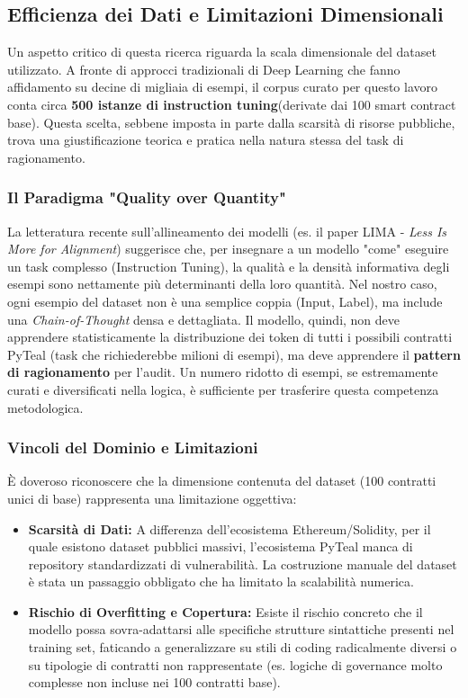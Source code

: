 \subsection{Efficienza dei Dati e Limitazioni Dimensionali}
\label{sec:dataset_limitations}

Un aspetto critico di questa ricerca riguarda la scala dimensionale del dataset utilizzato. A fronte di approcci tradizionali di Deep Learning che fanno affidamento su decine di migliaia di esempi, il corpus curato per questo lavoro conta circa\textbf{ 500 istanze di instruction tuning}(derivate dai 100 smart contract base).
Questa scelta, sebbene imposta in parte dalla scarsità di risorse pubbliche, trova una giustificazione teorica e pratica nella natura stessa del task di ragionamento.

\subsubsection{Il Paradigma "Quality over Quantity"}
La letteratura recente sull'allineamento dei modelli (es. il paper LIMA - \textit{Less Is More for Alignment}) \cite{zhou2023lima} suggerisce che, per insegnare a un modello "come" eseguire un task complesso (Instruction Tuning), la qualità e la densità informativa degli esempi sono nettamente più determinanti della loro quantità.
Nel nostro caso, ogni esempio del dataset non è una semplice coppia (Input, Label), ma include una \textit{Chain-of-Thought} densa e dettagliata. Il modello, quindi, non deve apprendere statisticamente la distribuzione dei token di tutti i possibili contratti PyTeal (task che richiederebbe milioni di esempi), ma deve apprendere il \textbf{pattern di ragionamento} per l'audit. Un numero ridotto di esempi, se estremamente curati e diversificati nella logica, è sufficiente per trasferire questa competenza metodologica.

\subsubsection{Vincoli del Dominio e Limitazioni}
È doveroso riconoscere che la dimensione contenuta del dataset (100 contratti unici di base) rappresenta una limitazione oggettiva:
\begin{itemize}
    \item \textbf{Scarsità di Dati:} A differenza dell'ecosistema Ethereum/Solidity, per il quale esistono dataset pubblici massivi, l'ecosistema PyTeal manca di repository standardizzati di vulnerabilità. La costruzione manuale del dataset è stata un passaggio obbligato che ha limitato la scalabilità numerica.
    \item \textbf{Rischio di Overfitting e Copertura:} Esiste il rischio concreto che il modello possa sovra-adattarsi alle specifiche strutture sintattiche presenti nel training set, faticando a generalizzare su stili di coding radicalmente diversi o su tipologie di contratti non rappresentate (es. logiche di governance molto complesse non incluse nei 100 contratti base).
\end{itemize}

